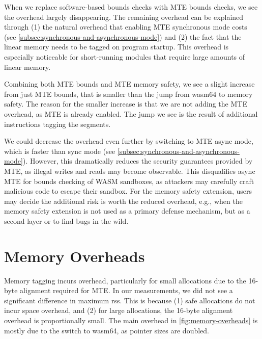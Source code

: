 When we replace software-based bounds checks with \ac{MTE} bounds checks, we see the overhead largely disappearing.
The remaining overhead can be explained through (1) the natural overhead that enabling \ac{MTE} synchronous mode costs (see \cref{subsec:synchronous-and-asynchronous-mode}) and (2) the fact that the linear memory needs to be tagged on program startup.
This overhead is especially noticeable for short-running modules that require large amounts of linear memory.

Combining both \ac{MTE} bounds and \ac{MTE} memory safety, we see a slight increase from just \ac{MTE} bounds, that is smaller than the jump from wasm64 to memory safety.
The reason for the smaller increase is that we are not adding the \ac{MTE} overhead, as \ac{MTE} is already enabled.
The jump we see is the result of additional instructions tagging the segments.

We could decrease the overhead even further by switching to \ac{MTE} async mode, which is faster than sync mode (see \cref{subsec:synchronous-and-asynchronous-mode}).
However, this dramatically reduces the security guarantees provided by \ac{MTE}, as illegal writes and reads may become observable.
This disqualifies async \ac{MTE} for bounds checking of \ac{WASM} sandboxes, as attackers may carefully craft malicious code to escape their sandbox.
For the memory safety extension, users may decide the additional risk is worth the reduced overhead, e.g., when the memory safety extension is not used as a primary defense mechanism, but as a second layer or to find bugs in the wild.


\section{Memory Overheads}\label{sec:memory-overheads}

Memory tagging incurs overhead, particularly for small allocations due to the 16-byte alignment required for \ac{MTE}.
In our measurements, we did not see a significant difference in maximum \ac{rss}.
This is because (1) safe allocations do not incur space overhead, and (2) for large allocations, the 16-byte alignment overhead is proportionally small.
The main overhead in \cref{fig:memory-overheads} is mostly due to the switch to wasm64, as pointer sizes are doubled.

\begin{figure*}[t]
    \centering
    
    \caption{PolyBench/C memory overheads of different configurations described in \cref{tab:benchmark-variants}, normalized to wasm64.}
    \label{fig:memory-overheads}
\end{figure*}


